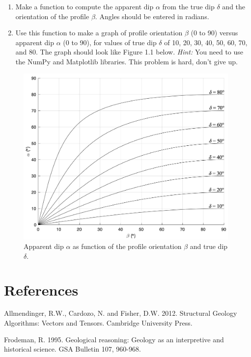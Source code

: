 \documentclass[a4paper , 12pt]{book}
\begin{document}
\begin{enumerate}
    \begin {enumerate}
    \item Make a function to compute the apparent dip $\alpha$ from the true dip $\delta$ and the orientation of the profile $\beta$. Angles should be entered in radians.
    \item Use this function to make a graph of profile orientation $\beta$ (0 to 90\degree) versus apparent dip $\alpha$ (0 to 90\degree), for values of true dip $\delta$ of 10, 20, 30, 40, 50, 60, 70, and 80\degree. The graph should look like Figure 1.1 below. \textit{Hint:} You need to use the NumPy and Matplotlib libraries. This problem is hard, don't give up.
    \end{enumerate}
    
    \begin{figure}[ht]
        \centering
        \includegraphics[width=11cm]{ch1f3.pdf}
        \caption{Apparent dip $\alpha$ as function of the profile orientation $\beta$ and true dip $\delta$.}
        \label{fig:apparentdip}
    \end{figure}
\end{enumerate}

\section*{References}

Allmendinger, R.W., Cardozo, N. and Fisher, D.W. 2012. Structural Geology Algorithms: Vectors and Tensors. Cambridge University Press.

Frodeman, R. 1995. Geological reasoning: Geology as an interpretive and historical science. GSA Bulletin 107, 960-968.
\end{document}
